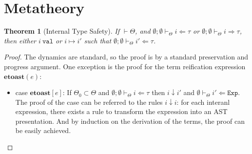 \documentclass[letterpaper, notitlepage]{article}
\newtheorem{theorem}{Theorem}
\begin{document}
\section{Metatheory}
\begin{theorem}[Internal Type Safety]
If $\vdash\Theta$, and $\emptyset;\emptyset\vdash_{\Theta}i\Leftarrow\tau$ or $\emptyset;\emptyset\vdash_{\Theta}i\Rightarrow\tau$, then either $i~\texttt{val}$ or $i\mapsto i'$ such that $\emptyset;\emptyset\vdash_{\Theta}i'\Leftarrow\tau$.
\end{theorem}
\begin{proof}
The dynamics are standard, so the proof is by a standard preservation and progress argument. One exception is the proof for the term reification expression $\mathbf{etoast}(e)$:
\begin{itemize}
\item {case $\mathbf{etoast}[e]$: If $\Theta_0\subset\Theta$ and $\emptyset;\emptyset\vdash_{\Theta}i\Leftarrow\tau$ then $i\downarrow i'$ and $\emptyset\vdash_{\Theta}i'\Leftarrow\mathtt{Exp}$.}
\\
The proof of the case can be referred to the rules $i\downarrow i$: for each interanl expression, there exists a rule to transform the expression into an AST presentation. And by induction on the derivation of the terms, the proof can be easily achieved.
\end{itemize}
\end{proof}
\end{document}
